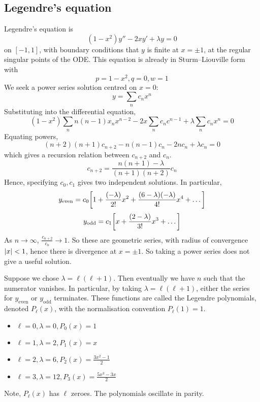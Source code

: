 \subsection{Legendre's equation}
Legendre's equation is
\[
	(1-x^2)y'' - 2xy' + \lambda y = 0
\]
on \( [-1,1] \), with boundary conditions that \( y \) is finite at \( x = \pm 1 \), at the regular singular points of the ODE.\@
This equation is already in Sturm--Liouville form with
\[
	p=1-x^2, q=0, w=1
\]
We seek a power series solution centred on \( x = 0 \):
\[
	y = \sum_n c_n x^n
\]
Substituting into the differential equation,
\[
	(1-x^2) \sum_n n(n-1) x_n x^{n-2} - 2x \sum_n c_n c^{n-1} + \lambda \sum_n c_n x^n = 0
\]
Equating powers,
\[
	(n+2)(n+1)c_{n+2} - n(n-1)c_n - 2n c_n + \lambda c_n = 0
\]
which gives a recursion relation between \( c_{n+2} \) and \( c_n \).
\[
	c_{n+2} = \frac{n(n+1) - \lambda}{(n+1)(n+2)} c_n
\]
Hence, specifying \( c_0, c_1 \) gives two independent solutions.
In particular,
\[
	y_{\text{even}} = c_0 \qty[1 + \frac{(-\lambda)}{2!}x^2 + \frac{(6-\lambda)(-\lambda)}{4!} x^4 + \dots]
\]
\[
	y_{\text{odd}} = c_1 \qty[x + \frac{(2-\lambda)}{3!}x^3 + \dots]
\]
As \( n \to \infty \), \( \frac{c_{n+2}}{c_n} \to 1 \).
So these are geometric series, with radius of convergence \( \abs{x} < 1 \), hence there is divergence at \( x = \pm 1 \).
So taking a power series does not give a useful solution.

Suppose we chose \( \lambda = \ell (\ell + 1) \).
Then eventually we have \( n \) such that the numerator vanishes.
In particular, by taking \( \lambda = \ell (\ell + 1) \), either the series for \( y_{\text{even}} \) or \( y_{\text{odd}} \) terminates.
These functions are called the Legendre polynomials, denoted \( P_\ell(x) \), with the normalisation convention \( P_\ell(1) = 1 \).
\begin{itemize}
	\item \( \ell = 0, \lambda = 0, P_0(x) = 1 \)
	\item \( \ell = 1, \lambda = 2, P_1(x) = x \)
	\item \( \ell = 2, \lambda = 6, P_2(x) = \frac{3x^2 - 1}{2} \)
	\item \( \ell = 3, \lambda = 12, P_3(x) = \frac{5x^3 - 3x}{2} \)
\end{itemize}
Note, \( P_\ell(x) \) has \( \ell \) zeroes.
The polynomials oscillate in parity.

